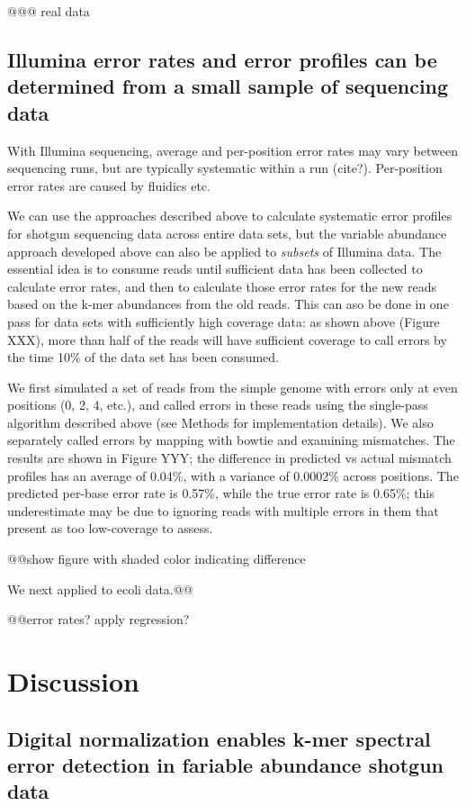 @@@ real data

\subsection{Illumina error rates and error profiles can be determined from a
small sample of sequencing data}

With Illumina sequencing, average and per-position error rates may
vary between sequencing runs, but are typically systematic within a
run (cite?).  Per-position error rates are caused by fluidics etc.

We can use the approaches described above to calculate systematic
error profiles for shotgun sequencing data across entire data sets,
but the variable abundance approach developed above can also be
applied to {\em subsets} of Illumina data.  The essential idea is to
consume reads until sufficient data has been collected to calculate
error rates, and then to calculate those error rates for the new reads
based on the k-mer abundances from the old reads.  This can aso be
done in one pass for data sets with sufficiently high coverage data:
as shown above (Figure XXX), more than half of the reads will have
sufficient coverage to call errors by the time 10\% of the data set
has been consumed.

We first simulated a set of reads from the simple genome with errors
only at even positions (0, 2, 4, etc.), and called errors in these
reads using the single-pass algorithm described above (see Methods for
implementation details).  We also separately called errors by mapping
with bowtie and examining mismatches.  The results are shown in Figure
YYY; the difference in predicted vs actual mismatch profiles has an
average of 0.04\%, with a variance of 0.0002\% across positions.  The
predicted per-base error rate is 0.57\%, while the true error rate is
0.65\%; this underestimate may be due to ignoring reads with multiple
errors in them that present as too low-coverage to assess.

@@show figure with shaded color indicating difference

We next applied to ecoli data.@@

@@error rates? apply regression?

\section{Discussion}

\subsection{Digital normalization enables k-mer spectral error detection in fariable abundance shotgun data}

